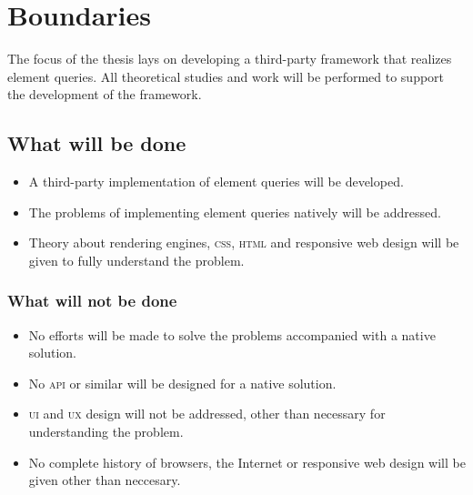 \documentclass[oneside,a4paper,11pt]{kth-mag}
\begin{document}
\section*{Boundaries}
The focus of the thesis lays on developing a third-party framework that realizes element queries. All theoretical studies and work will be performed to support the development of the framework.

\subsection*{What will be done}
\begin{itemize}
\item A third-party implementation of element queries will be developed.
\item The problems of implementing element queries natively will be addressed.
\item Theory about rendering engines, \textsc{css}, \textsc{html} and responsive web design will be given to fully understand the problem.
\end{itemize}

\subsubsection*{What will not be done}
\begin{itemize}
\item No efforts will be made to solve the problems accompanied with a native solution.
\item No \textsc{api} or similar will be designed for a native solution.
\item \textsc{ui} and \textsc{ux} design will not be addressed, other than necessary for understanding the problem.
\item No complete history of browsers, the Internet or responsive web design will be given other than neccesary.
\end{itemize}
\end{document}
